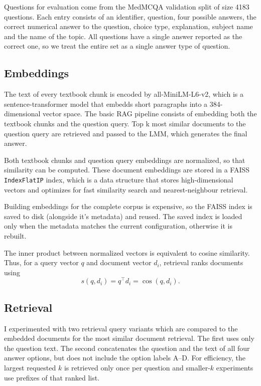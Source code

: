 \documentclass{article}
\begin{document}
Questions for evaluation come from the MedMCQA validation split of size 4183 questions.
Each entry consists of an identifier, question, four possible answers, 
the correct numerical answer to the question, choice type, explanation, subject name and the name of the topic.
All questions have a single answer reported as the correct one, so we treat the entire set
as a single answer type of question.

\subsection{Embeddings}

The text of every textbook chunk is encoded by all-MiniLM-L6-v2,
which is a sentence-transformer model that embedds short paragraphs
into a 384-dimensional vector space. 
The basic RAG pipeline consists of embedding both the textbook chunks
and the question query. Top k most similar documents to the question query
are retrieved and passed to the LMM, which generates the final answer.

Both textbook chunks and question query embeddings are normalized, 
so that similarity can be computed. These document embeddings are stored in
a FAISS \texttt{IndexFlatIP} index, which is a data structure that stores high-dimensional
vectors and optimizes for fast similarity search and nearest-neighbour retrieval.

Building embeddings for the complete corpus is expensive, so the FAISS index is
saved to disk (alongside it's metadata) and reused. 
The saved index is loaded only when the metadata matches the current configuration,
otherwise it is rebuilt.

The inner product between normalized vectors is equivalent to cosine similarity.
Thus, for a query vector $q$ and document vector
$d_i$, retrieval ranks documents using
\begin{equation}
    s(q,d_i)=q^\top d_i=\cos(q,d_i).
\end{equation}

\subsection{Retrieval}
I experimented with two retrieval query variants which are compared to the
embedded documents for the most similar document retrieval.
The first uses only the question text.
The second concatenates the question and the text of all four answer options, but
does not include the option labels A--D. For efficiency, the largest requested
$k$ is retrieved only once per question and smaller-$k$ experiments use prefixes of
that ranked list. 
\end{document}
